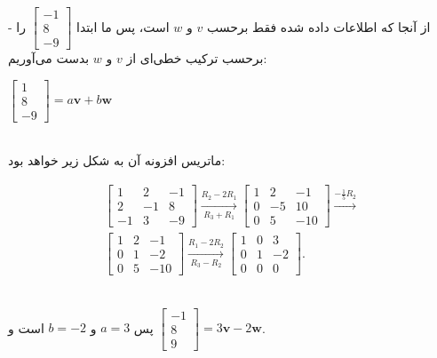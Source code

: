 \documentclass{article}
\begin{document}
	\begin{Answer}
	- از آنجا که اطلاعات داده شده فقط برحسب $v$ و $w$ است، پس ما ابتدا 
		$\begin{bmatrix} 
			-1 \\ 
			8 \\ 
			-9 
		\end{bmatrix}$
	را برحسب ترکیب خطی‌ای از $v$ و $w$ بدست می‌آوریم:\\
	\begin{flushleft}
	$\begin{bmatrix} 
		1 \\ 
		8 \\ 
		-9 
	\end{bmatrix}=a\mathbf{v}+b\mathbf{w}$\\
	\end{flushleft}\\
ماتریس افزونه آن به شکل زیر خواهد بود:
	\begin{flushleft}
		\begin{align*} 
			\left[\begin{array}{rr|r} 
				1 & 2 & -1 \\ 
				2 &-1 &8 \\ 
				-1 & 3 & -9 
			\end{array}\right]
			\xrightarrow[R_3+R_1]{R_2-2R_1} 
			\left[\begin{array}{rr|r} 
				1 & 2 & -1 \\ 
				0 &-5 &10 \\ 
				0 & 5 & -10 
			\end{array}\right]
			\xrightarrow{-\frac{1}{5}R_2}\\[6pt]
			\left[\begin{array}{rr|r} 
				1 & 2 & -1 \\ 
				0 &1 &-2 \\ 
				0 & 5 & -10 
			\end{array}\right]
			\xrightarrow[R_3-R_2]{R_1-2R_2} 
			\left[\begin{array}{rr|r} 
				1 & 0 & 3 \\ 
				0 &1 &-2 \\ 
				0 & 0 & 0 
			\end{array}\right]. 
		\end{align*}
	\end{flushleft}\\
	پس $a=3$ و $b=-2$ است و 
	$\begin{bmatrix} 
		-1 \\ 
		8 \\ 
		9 
	\end{bmatrix}=3\mathbf{v}-2\mathbf{w}$.\\

\end{Answer}
\end{document}
